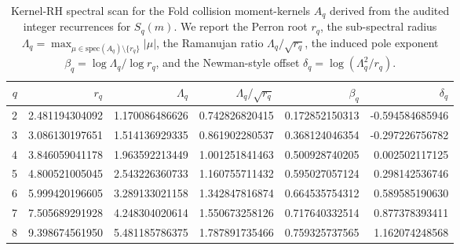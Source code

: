 \begin{table}[H]
\centering
\scriptsize
\setlength{\tabcolsep}{6pt}
\caption{Kernel-RH spectral scan for the Fold collision moment-kernels $A_q$ derived from the audited integer recurrences for $S_q(m)$. We report the Perron root $r_q$, the sub-spectral radius $\Lambda_q=\max_{\mu\in\mathrm{spec}(A_q)\setminus\{r_q\}}|\mu|$, the Ramanujan ratio $\Lambda_q/\sqrt{r_q}$, the induced pole exponent $\beta_q=\log\Lambda_q/\log r_q$, and the Newman-style offset $\delta_q=\log(\Lambda_q^2/r_q)$.}
\label{tab:fold_collision_kernel_rh_scan_q2_8}
\begin{tabular}{r r r r r r}
\toprule
$q$ & $r_q$ & $\Lambda_q$ & $\Lambda_q/\sqrt{r_q}$ & $\beta_q$ & $\delta_q$\\
\midrule
2 & 2.481194304092 & 1.170086486626 & 0.742826820415 & 0.172852150313 & -0.594584685946\\
3 & 3.086130197651 & 1.514136929335 & 0.861902280537 & 0.368124046354 & -0.297226756782\\
4 & 3.846059041178 & 1.963592213449 & 1.001251841463 & 0.500928740205 & 0.002502117125\\
5 & 4.800521005045 & 2.543226360733 & 1.160755711432 & 0.595027057124 & 0.298142536746\\
6 & 5.999420196605 & 3.289133021158 & 1.342847816874 & 0.664535754312 & 0.589585190630\\
7 & 7.505689291928 & 4.248304020614 & 1.550673258126 & 0.717640332514 & 0.877378393411\\
8 & 9.398674561950 & 5.481185786375 & 1.787891735466 & 0.759325737565 & 1.162074248568\\
\bottomrule
\end{tabular}
\end{table}
